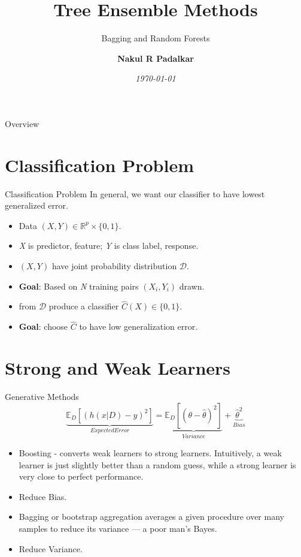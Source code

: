 \documentclass[11pt,aspectratio=1610,usenames,dvipsnames]{beamer} %
\title{Tree Ensemble Methods}
\subtitle{Bagging and Random Forests}
\author[Nakul R Padalkar] %
{\bfseries Nakul R Padalkar} %
\institute[Georgetown University]{\MakeUppercase{Georgetown University}} %
\date{\it\today}
\begin{document}
\begin{frame}[plain]
\maketitle
\end{frame}

\begin{frame}{Overview}

\begin{multicols}{2}
	\tableofcontents[]
\end{multicols}
\end{frame}

\section{Classification Problem}
\begin{frame}{Classification Problem}
	In general, we want our classifier to have lowest generalized error.
	\begin{itemize}%
		\item Data $ (X,Y) \in \mathbb{R}^{p} \times \{0,1\} $.
		\item \textit{X} is predictor, feature; \textit{Y} is class label, response.
		\item $ (X, Y) $ have joint probability distribution $\mathcal{D}$.
		\item \textbf{Goal}: Based on \textit{N} training pairs $ (X_{i}, Y_{i}) $ drawn.
		\item from $\mathcal{D}$ produce a classifier $ \hat{C}(X) \in \{0, 1\} $.
		\item \textbf{Goal}: choose $\hat{C}$ to have low generalization error.
	\end{itemize}
\end{frame}

\section{Strong and Weak Learners}
\begin{frame}{Generative Methods}
	\begin{equation*}
		\underbrace{\mathbb{E}_{D}[(h(x|D) - y)^{2}]}_{Expected Error} = \underbrace{\mathbb{E}_{D}[(\theta-\hat{\theta})^{2}]}_{Variance} + \underbrace{\hat{\theta}^{2}}_{Bias}
	\end{equation*}
	\begin{itemize}%
 		\item Boosting - converts weak learners to strong learners. Intuitively, a weak learner is just slightly better than a random guess, while a strong learner is very close to perfect performance.	
 		\item {} Reduce Bias.
		\item Bagging or bootstrap aggregation averages a given procedure over many samples to reduce its variance — a poor man's Bayes.
		\item {} Reduce Variance.
	\end{itemize}
\end{frame}
\end{document}

